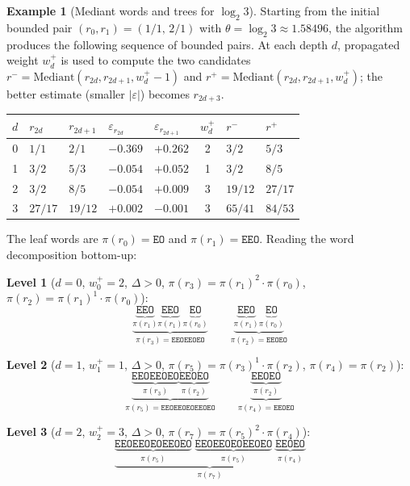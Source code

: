 \documentclass[12pt]{article}
\theoremstyle{definition}
\newtheorem{example}[theorem]{Example}
\theoremstyle{remark}
\theoremstyle{plain}
\newcommand{\eps}{\varepsilon}
\newcommand{\rplus}{r^{+}}
\newcommand{\rminus}{r^{-}}
\begin{document}
\begin{example}[Mediant words and trees for $\log_2 3$]
\label{ex:log2-3}
Starting from the initial bounded pair $(r_0, r_1) = (1/1,\, 2/1)$ with
$\theta = \log_2 3 \approx 1.58496$,
the algorithm produces the following sequence of bounded pairs.
At each depth $d$, propagated weight $w^+_d$ is used to compute the two candidates
$\rminus = \mathrm{Mediant}(r_{2d}, r_{2d+1}, w^+_d-1)$ and
$\rplus = \mathrm{Mediant}(r_{2d}, r_{2d+1}, w^+_d)$;
the better estimate (smaller $|\eps|$) becomes $r_{2d+3}$.

\medskip
\begin{center}
\begin{tabular}{@{}cllllcll@{}}
\toprule
$d$ & $r_{2d}$ & $r_{2d+1}$ & $\eps_{r_{2d}}$ & $\eps_{r_{2d+1}}$ & $w^+_d$ & $\rminus$ & $\rplus$ \\
\midrule
0 & $1/1$   & $2/1$   & $-0.369$ & $+0.262$ & 2 & $3/2$   & $5/3$   \\
1 & $3/2$   & $5/3$   & $-0.054$ & $+0.052$ & 1 & $3/2$   & $8/5$   \\
2 & $3/2$   & $8/5$   & $-0.054$ & $+0.009$ & 3 & $19/12$ & $27/17$ \\
3 & $27/17$ & $19/12$ & $+0.002$ & $-0.001$ & 3 & $65/41$ & $84/53$ \\
\bottomrule
\end{tabular}
\end{center}
\medskip

The leaf words are $\pi(r_0) = \mathtt{EO}$ and $\pi(r_1) = \mathtt{EEO}$.
Reading the word decomposition bottom-up:

\medskip
\noindent
\textbf{Level 1} ($d=0$, $w^+_0=2$, $\Delta>0$,
$\pi(r_3)=\pi(r_1)^2\cdot\pi(r_0)$, $\pi(r_2)=\pi(r_1)^1\cdot\pi(r_0)$):
\[
\underbrace{
  \underbrace{\mathtt{EEO}}_{\pi(r_1)}
  \underbrace{\mathtt{EEO}}_{\pi(r_1)}
  \underbrace{\mathtt{EO}}_{\pi(r_0)}
}_{\pi(r_3)=\mathtt{EEOEEOEO}}
\qquad
\underbrace{
  \underbrace{\mathtt{EEO}}_{\pi(r_1)}
  \underbrace{\mathtt{EO}}_{\pi(r_0)}
}_{\pi(r_2)=\mathtt{EEOEO}}
\]

\noindent
\textbf{Level 2} ($d=1$, $w^+_1=1$, $\Delta>0$,
$\pi(r_5)=\pi(r_3)^1\cdot\pi(r_2)$, $\pi(r_4)=\pi(r_2)$):
\[
\underbrace{
  \underbrace{\mathtt{EEOEEOEO}}_{\pi(r_3)}
  \underbrace{\mathtt{EEOEO}}_{\pi(r_2)}
}_{\pi(r_5)=\mathtt{EEOEEOEOEEOEO}}
\qquad
\underbrace{
  \underbrace{\mathtt{EEOEO}}_{\pi(r_2)}
}_{\pi(r_4)=\mathtt{EEOEO}}
\]

\noindent
\textbf{Level 3} ($d=2$, $w^+_2=3$, $\Delta>0$,
$\pi(r_7)=\pi(r_5)^2\cdot\pi(r_4)$):
\[
\underbrace{
  \underbrace{\mathtt{EEOEEOEOEEOEO}}_{\pi(r_5)}
  \;
  \underbrace{\mathtt{EEOEEOEOEEOEO}}_{\pi(r_5)}
  \;
  \underbrace{\mathtt{EEOEO}}_{\pi(r_4)}
}_{\pi(r_7)}
\]


\end{example}
\end{document}
